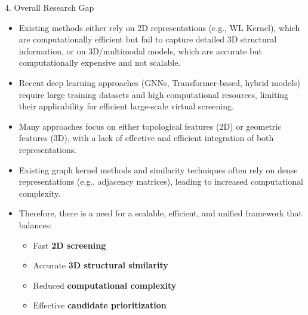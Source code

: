 \documentclass[aspectratio=169, 11pt]{beamer}
\begin{document}
\begin{frame}{4. Overall Research Gap}
\begin{itemize}
    \item Existing methods either rely on 2D representations (e.g., WL Kernel), which are computationally efficient but fail to capture detailed 3D structural information, or on 3D/multimodal models, which are accurate but computationally expensive and not scalable.

    \item Recent deep learning approaches (GNNs, Transformer-based, hybrid models) require large training datasets and high computational resources, limiting their applicability for efficient large-scale virtual screening.

    \item Many approaches focus on either topological features (2D) or geometric features (3D), with a lack of effective and efficient integration of both representations.

    \item Existing graph kernel methods and similarity techniques often rely on dense representations (e.g., adjacency matrices), leading to increased computational complexity.

    \item Therefore, there is a need for a scalable, efficient, and unified framework that balances:
    \begin{itemize}
        \item Fast \textbf{2D screening}
        \item Accurate \textbf{3D structural similarity}
        \item Reduced \textbf{computational complexity}
        \item Effective \textbf{candidate prioritization}
    \end{itemize}
\end{itemize}
\end{frame}

\end{document}
